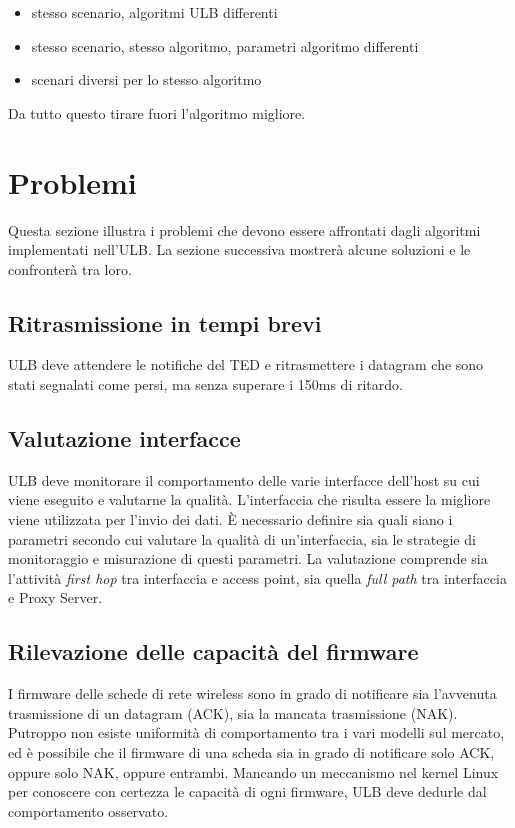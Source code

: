 \documentclass[12pt,a4paper,openright,twoside]{book}
\begin{document}
\begin{itemize}
\item stesso scenario, algoritmi ULB differenti
\item stesso scenario, stesso algoritmo, parametri algoritmo differenti
\item scenari diversi per lo stesso algoritmo
\end{itemize}

Da tutto questo tirare fuori l'algoritmo migliore.

\section{Problemi}
Questa sezione illustra i problemi che devono essere affrontati dagli
algoritmi implementati nell'ULB. La sezione successiva mostrerà alcune
soluzioni e le confronterà tra loro.

\subsection{Ritrasmissione in tempi brevi}
ULB deve attendere le notifiche del TED e ritrasmettere i datagram che
sono stati segnalati come persi, ma senza superare i 150ms di ritardo.

\subsection{Valutazione interfacce}
ULB deve monitorare il comportamento delle varie interfacce dell'host
su cui viene eseguito e valutarne la qualità. L'interfaccia che
risulta essere la migliore viene utilizzata per l'invio dei dati. È
necessario definire sia quali siano i parametri secondo cui valutare
la qualità di un'interfaccia, sia le strategie di monitoraggio e
misurazione di questi parametri. La valutazione comprende sia
l'attività \emph{first hop} tra interfaccia e access point, sia quella
\emph{full path} tra interfaccia e Proxy Server.

\subsection{Rilevazione delle capacità del firmware}
I firmware delle schede di rete wireless sono in grado di notificare
sia l'avvenuta trasmissione di un datagram (ACK), sia la mancata
trasmissione (NAK). Putroppo non esiste uniformità di comportamento
tra i vari modelli sul mercato, ed è possibile che il firmware di una
scheda sia in grado di notificare solo ACK, oppure solo NAK, oppure
entrambi. Mancando un meccanismo nel kernel Linux per conoscere con
certezza le capacità di ogni firmware, ULB deve dedurle dal
comportamento osservato.
\end{document}
